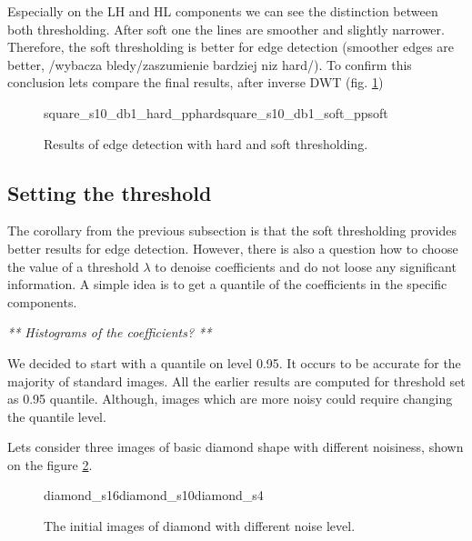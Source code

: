 Especially on the LH and HL components we can see the distinction between both thresholding. After soft one the lines are smoother and slightly narrower. Therefore, the soft thresholding is better for edge detection (smoother edges are better, /wybacza bledy/zaszumienie bardziej niz hard/). To confirm this conclusion lets compare the final results, after inverse DWT (fig. \ref{fig:square_s10_idwt_pp})

\begin{figure}[h]
	\begin{subdiagrams2}{square_s10_db1_hard_pp}{hard}{square_s10_db1_soft_pp}{soft}
	\end{subdiagrams2}
	\centering
	\caption{Results of edge detection with hard and soft thresholding.}
	\label{fig:square_s10_idwt_pp}
\end{figure}

\subsection{Setting the threshold}
The corollary from the previous subsection is that the soft thresholding provides better results for edge detection. However, there is also a question how to choose the value of a threshold $\lambda$ to denoise coefficients and do not loose any significant information. A simple idea is to get a quantile of the coefficients in the specific components. 

\textit{** Histograms of the coefficients? **}

We decided to start with a quantile on level 0.95. It occurs to be accurate for the majority of standard images. All the earlier results are computed for threshold set as 0.95 quantile. Although, images which are more noisy could require changing the quantile level.

Lets consider three images of basic diamond shape with different noisiness, shown on the figure \ref{fig:diamonds}.

\begin{figure}[h]
	\begin{subdiagrams3}{diamond_s16}{}{diamond_s10}{}{diamond_s4}{}
	\end{subdiagrams3}
	\centering
	\caption{The initial images of diamond with different noise level.}
	\label{fig:diamonds}
\end{figure}

